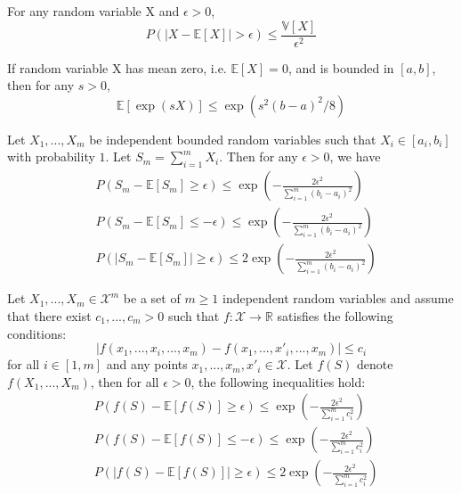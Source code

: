 \begin{theorem}
	For any random variable X and $\epsilon > 0$,
	$$P(|X-\mathbb{E}[X]| > \epsilon) \leq \frac{\mathbb{V}[X]}{\epsilon^2}$$
\end{theorem}

\begin{lemma}
	If random variable X has mean zero, i.e. $\mathbb{E}[X]=0$, and is bounded in $[a,b]$, then for any $s > 0$,
	$$\mathbb{E}[\exp(sX)] \leq \exp(s^2(b-a)^2/8)$$
\end{lemma}

\begin{theorem}
	Let $X_1 ,..., X_m$ be independent bounded  random variables such that $X_i \in [a_i, b_i]$ with probability $1$. Let $S_m=\sum_{i=1}^{m} X_i$. Then for any $\epsilon > 0$, we have
	\begin{align}
	& P(S_m-\mathbb{E}[S_m] \geq \epsilon) \leq \exp \left(-\frac{2\epsilon^2}{\sum_{i=1}^{m}(b_i-a_i)^2} \right)\\
	& P(S_m-\mathbb{E}[S_m] \leq -\epsilon) \leq \exp \left(-\frac{2\epsilon^2}{\sum_{i=1}^{m}(b_i-a_i)^2} \right)\\
	& P(|S_m-\mathbb{E}[S_m]| \geq \epsilon) \leq 2\exp \left(-\frac{2\epsilon^2}{\sum_{i=1}^{m}(b_i-a_i)^2} \right)
	\end{align}	
\end{theorem}

\begin{theorem}
	Let $X_1,...,X_m \in \mathcal{X}^m$ be a set of $m \geq 1$ independent random variables and assume that there exist $c_1,...,c_m > 0$ such that $f: \mathcal{X} \to \mathbb{R}$ satisfies the following conditions:
	$$|f(x_1,...,x_i,...,x_m)-f(x_1,...,x\prime_i,...,x_m)| \leq c_i$$
	for all $i \in [1,m]$ and any points $x_1,...,x_m,x\prime_i \in \mathcal{X}$. Let $f(S)$ denote $f(X_1,...,X_m)$, then for all $\epsilon > 0$, the following inequalities hold:
	\begin{align}
	& P(f(S)-\mathbb{E}[f(S)] \geq \epsilon) \leq \exp \left(-\frac{2\epsilon^2}{\sum_{i=1}^{m}c_i^2} \right)\\
	& P(f(S)-\mathbb{E}[f(S)] \leq -\epsilon) \leq \exp \left(-\frac{2\epsilon^2}{\sum_{i=1}^{m}c_i^2} \right)\\
	& P(|f(S)-\mathbb{E}[f(S)]| \geq \epsilon) \leq 2\exp \left(-\frac{2\epsilon^2}{\sum_{i=1}^{m}c_i^2} \right)
	\end{align}
\end{theorem}

